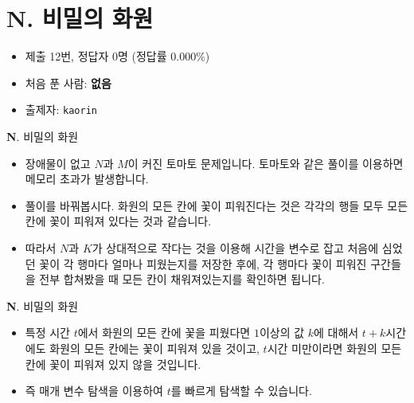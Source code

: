\section{N. 비밀의 화원}

\begin{frame} %
    \begin{itemize}
        \item 제출 12번, 정답자 0명 (정답률 0.000\%)
        \item 처음 푼 사람: \textbf{없음}
        \item 출제자: \texttt{kaorin}
    \end{itemize}
\end{frame}

\begin{frame}{\textbf{N}. 비밀의 화원}
    \begin{itemize}
        \item 장애물이 없고 $N$과 $M$이 커진 토마토 문제입니다. 토마토와 같은 풀이를 이용하면 메모리 초과가 발생합니다.
        \item 풀이를 바꿔봅시다. 화원의 모든 칸에 꽃이 피워진다는 것은 각각의 행들 모두 모든 칸에 꽃이 피워져 있다는 것과 같습니다.
        \item 따라서 $N$과 $K$가 상대적으로 작다는 것을 이용해 시간을 변수로 잡고 처음에 심었던 꽃이 각 행마다 얼마나 피웠는지를 저장한 후에, 각 행마다 꽃이 피워진 구간들을 전부 합쳐봤을 때 모든 칸이 채워져있는지를 확인하면 됩니다.
    \end{itemize}
\end{frame}

\begin{frame}{\textbf{N}. 비밀의 화원}
    \begin{itemize}
        \item 특정 시간 $t$에서 화원의 모든 칸에 꽃을 피웠다면 $1$이상의 값 $k$에 대해서 $t+k$시간에도 화원의 모든 칸에는 꽃이 피워져 있을 것이고, $t$시간 미만이라면 화원의 모든 칸에 꽃이 피워져 있지 않을 것입니다.
        \item 즉 매개 변수 탐색을 이용하여 $t$를 빠르게 탐색할 수 있습니다.
    \end{itemize}
\end{frame}

